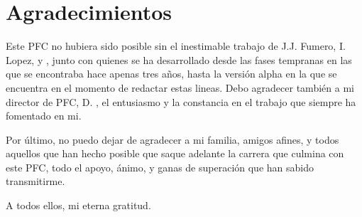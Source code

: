 \chapter*{Agradecimientos}

\bigskip

Este \ac{PFC} no hubiera sido posible sin el inestimable trabajo de J.J. Fumero, I. Lopez,
y \codirectorthesis{}, junto con quienes se ha desarrollado \accULL{} desde las fases 
tempranas en las
que se encontraba hace apenas tres años, hasta la versión alpha en la que se encuentra
en el momento de redactar estas lineas. Debo agradecer también a mi director de \ac{PFC},
D. \directorthesis{}, el entusiasmo y la constancia en el trabajo que siempre ha fomentado 
en mi.

Por último, no puedo dejar de agradecer a mi familia, amigos afines, y todos aquellos que
han hecho posible que saque adelante la carrera que culmina con este \ac{PFC}, todo el 
apoyo, ánimo, y ganas de superación que han sabido transmitirme.

A todos ellos, mi eterna gratitud.